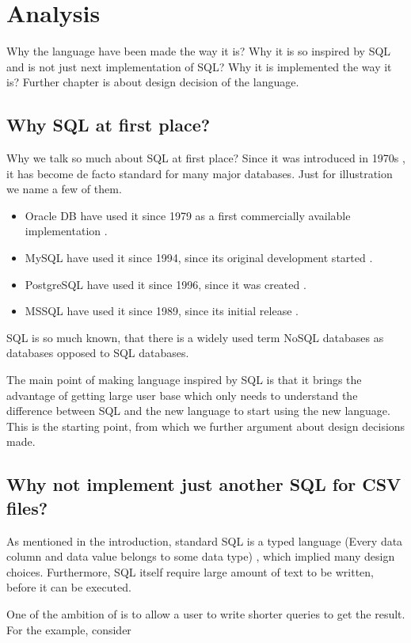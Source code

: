 \chapter{Analysis}
Why the language have been made the way it is? Why it is so inspired by SQL and is not just next implementation of SQL?
Why it is implemented the way it is?
Further chapter is about design decision of the language.


\section{Why SQL at first place?}
Why we talk so much about SQL at first place? Since it was introduced in 1970s \cite{enwiki-sql}, it has
become de facto standard for many major databases. Just for illustration we name a few of them.
\begin{itemize}
    \item Oracle DB have used it since 1979 as a first commercially available implementation \cite{oracle-db-sql}. 
    \item MySQL have used it since 1994, since its original development started \cite{enwiki-mysql}.
    \item PostgreSQL have used it since 1996, since it was created \cite{postgres-birthday}. 
    \item MSSQL have used it since 1989, since its initial release \cite{enwiki-mssql}. 
\end{itemize}

SQL is so much known, that there is a widely used term NoSQL databases as databases opposed to SQL databases.

The main point of making language inspired by SQL is that it brings the advantage of getting large user base which only needs to understand the difference between SQL and the new language to start using the new language. This is the starting point, from which we further argument about design decisions made.


\section{Why not implement just another SQL for CSV files?}
As mentioned in the introduction, standard SQL is a typed language (Every data column and data value belongs to some data type) \cite{ISO9075-2023}, 
which implied many design choices. Furthermore, SQL itself require large amount of text to be written,
before it can be executed. 

One of the ambition of  is to allow a user to write shorter queries to get the result. For the example,
consider

